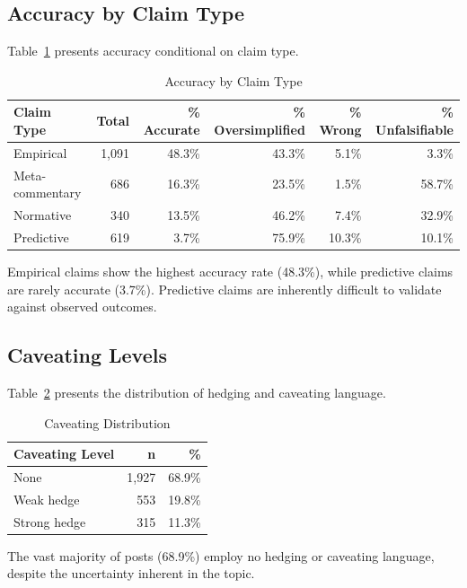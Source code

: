 \documentclass[11pt,preprint]{article}
\begin{document}
\subsection{Accuracy by Claim Type}

Table~\ref{tab:accuracy_claim} presents accuracy conditional on claim type.

\begin{table}[h]
\centering
\caption{Accuracy by Claim Type}
\label{tab:accuracy_claim}
\begin{tabular}{lrrrrr}
\toprule
\textbf{Claim Type} & \textbf{Total} & \textbf{\% Accurate} & \textbf{\% Oversimplified} & \textbf{\% Wrong} & \textbf{\% Unfalsifiable} \\
\midrule
Empirical & 1,091 & 48.3\% & 43.3\% & 5.1\% & 3.3\% \\
Meta-commentary & 686 & 16.3\% & 23.5\% & 1.5\% & 58.7\% \\
Normative & 340 & 13.5\% & 46.2\% & 7.4\% & 32.9\% \\
Predictive & 619 & 3.7\% & 75.9\% & 10.3\% & 10.1\% \\
\bottomrule
\end{tabular}
\end{table}

Empirical claims show the highest accuracy rate (48.3\%), while predictive claims are rarely accurate (3.7\%). Predictive claims are inherently difficult to validate against observed outcomes.

\subsection{Caveating Levels}

Table~\ref{tab:caveating} presents the distribution of hedging and caveating language.

\begin{table}[h]
\centering
\caption{Caveating Distribution}
\label{tab:caveating}
\begin{tabular}{lrr}
\toprule
\textbf{Caveating Level} & \textbf{n} & \textbf{\%} \\
\midrule
None & 1,927 & 68.9\% \\
Weak hedge & 553 & 19.8\% \\
Strong hedge & 315 & 11.3\% \\
\bottomrule
\end{tabular}
\end{table}

The vast majority of posts (68.9\%) employ no hedging or caveating language, despite the uncertainty inherent in the topic.
\end{document}
